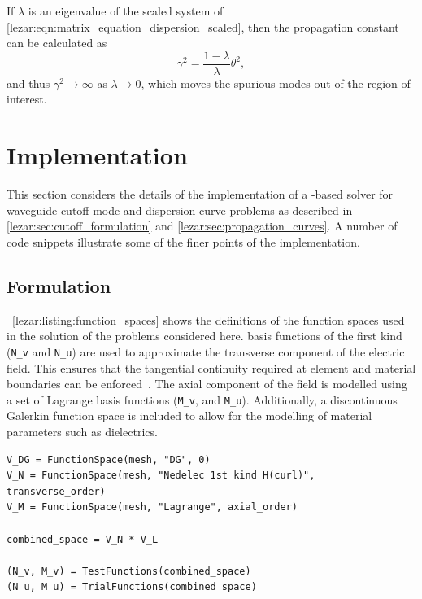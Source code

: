 If $\lambda$ is an eigenvalue of the scaled system of
\eqref{lezar:eqn:matrix_equation_dispersion_scaled}, then the propagation constant can be
calculated as
\begin{equation}
    \gamma^2 = \frac{1 - \lambda}{\lambda}\theta^2,
\end{equation}
and thus $\gamma^2 \rightarrow \infty$ as $\lambda \rightarrow 0$, which moves the spurious modes out of the region of interest. 

\section{Implementation}
\label{lezar:sec:Implementation}

This section considers the details of the
implementation of a \fenics-based solver for waveguide cutoff mode and
dispersion curve problems as described in \ref{lezar:sec:cutoff_formulation}
and \ref{lezar:sec:propagation_curves}. A number of code snippets illustrate
some of the finer points of the implementation.

\subsection{Formulation}
\lstlistingname{}~\ref{lezar:listing:function_spaces} shows the definitions of the function spaces used in the solution of the problems considered here. \nedelec{} basis functions of the first kind ({\tt N\_v} and {\tt N\_u}) are used to approximate the transverse component of the electric field. This ensures that the tangential continuity required at element and material boundaries can be enforced~\cite{Jin2002}.  The axial component of the field is modelled using a set of Lagrange basis functions ({\tt M\_v}, and {\tt M\_u}). Additionally, a discontinuous Galerkin function space is included to allow for the modelling of material parameters such as dielectrics.
\begin{lstlisting}[float=ht,caption=Function spaces and basis functions.,label=lezar:listing:function_spaces]
V_DG = FunctionSpace(mesh, "DG", 0) 
V_N = FunctionSpace(mesh, "Nedelec 1st kind H(curl)", transverse_order) 
V_M = FunctionSpace(mesh, "Lagrange", axial_order)

combined_space = V_N * V_L

(N_v, M_v) = TestFunctions(combined_space)
(N_u, M_u) = TrialFunctions(combined_space)
\end{lstlisting}

